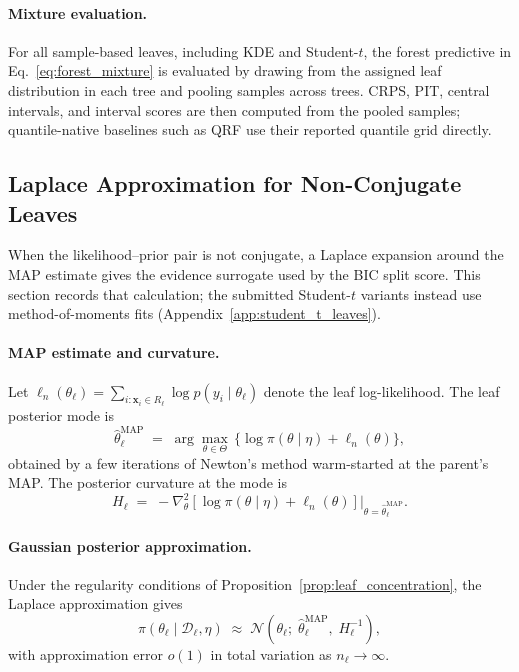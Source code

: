 \documentclass[10pt]{article} %
\begin{document}
\paragraph{Mixture evaluation.}
For all sample-based leaves, including KDE and Student-$t$, the forest predictive in Eq.~\eqref{eq:forest_mixture} is evaluated by drawing from the assigned leaf distribution in each tree and pooling samples across trees. CRPS, PIT, central intervals, and interval scores are then computed from the pooled samples; quantile-native baselines such as QRF use their reported quantile grid directly.

\subsection{Laplace Approximation for Non-Conjugate Leaves}
\label{app:approximate-bayesian-calculations-non-conjugate}

When the likelihood--prior pair is not conjugate, a Laplace expansion around the MAP estimate gives the evidence surrogate used by the BIC split score. This section records that calculation; the submitted Student-$t$ variants instead use method-of-moments fits (Appendix~\ref{app:student_t_leaves}).

\paragraph{MAP estimate and curvature.}
Let $\ell_n(\theta_\ell) = \sum_{i:\mathbf{x}_i\in R_\ell} \log p(y_i\mid\theta_\ell)$ denote the leaf log-likelihood. The leaf posterior mode is
\[
\hat{\theta}_\ell^{\mathrm{MAP}} \;=\; \arg\max_{\theta\in\Theta}\, \big\{\log \pi(\theta\mid\eta) + \ell_n(\theta)\big\},
\]
obtained by a few iterations of Newton's method warm-started at the parent's MAP. The posterior curvature at the mode is
\[
H_\ell \;=\; -\nabla_{\theta}^{2}\!\left[\log\pi(\theta\mid\eta) + \ell_n(\theta)\right]\!\big|_{\theta=\hat{\theta}_\ell^{\mathrm{MAP}}}.
\]

\paragraph{Gaussian posterior approximation.}
Under the regularity conditions of Proposition~\ref{prop:leaf_concentration}, the Laplace approximation gives
\[
\pi(\theta_\ell\mid\mathcal{D}_\ell,\eta) \;\approx\; \mathcal{N}\!\left(\theta_\ell;\; \hat{\theta}_\ell^{\mathrm{MAP}},\; H_\ell^{-1}\right),
\]
with approximation error $o(1)$ in total variation as $n_\ell\to\infty$.
\end{document}
